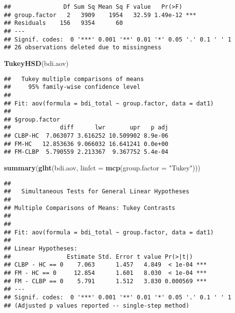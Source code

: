 \documentclass[]{article}
\newenvironment{Shaded}{\begin{snugshade}}{\end{snugshade}}
\newcommand{\KeywordTok}[1]{\textcolor[rgb]{0.13,0.29,0.53}{\textbf{#1}}}
\newcommand{\DataTypeTok}[1]{\textcolor[rgb]{0.13,0.29,0.53}{#1}}
\newcommand{\StringTok}[1]{\textcolor[rgb]{0.31,0.60,0.02}{#1}}
\newcommand{\OperatorTok}[1]{\textcolor[rgb]{0.81,0.36,0.00}{\textbf{#1}}}
\newcommand{\NormalTok}[1]{#1}
\begin{document}
\begin{verbatim}
##               Df Sum Sq Mean Sq F value   Pr(>F)    
## group.factor   2   3909    1954   32.59 1.49e-12 ***
## Residuals    156   9354      60                     
## ---
## Signif. codes:  0 '***' 0.001 '**' 0.01 '*' 0.05 '.' 0.1 ' ' 1
## 26 observations deleted due to missingness
\end{verbatim}

\begin{Shaded}
\begin{Highlighting}[]
\KeywordTok{TukeyHSD}\NormalTok{(bdi.aov)}
\end{Highlighting}
\end{Shaded}

\begin{verbatim}
##   Tukey multiple comparisons of means
##     95% family-wise confidence level
## 
## Fit: aov(formula = bdi_total ~ group.factor, data = dat1)
## 
## $group.factor
##              diff      lwr       upr   p adj
## CLBP-HC  7.063077 3.616252 10.509902 8.9e-06
## FM-HC   12.853636 9.066032 16.641241 0.0e+00
## FM-CLBP  5.790559 2.213367  9.367752 5.4e-04
\end{verbatim}

\begin{Shaded}
\begin{Highlighting}[]
\KeywordTok{summary}\NormalTok{(}\KeywordTok{glht}\NormalTok{(bdi.aov, }\DataTypeTok{linfct =} \KeywordTok{mcp}\NormalTok{(}\DataTypeTok{group.factor =} \StringTok{"Tukey"}\NormalTok{)))}
\end{Highlighting}
\end{Shaded}

\begin{verbatim}
## 
##   Simultaneous Tests for General Linear Hypotheses
## 
## Multiple Comparisons of Means: Tukey Contrasts
## 
## 
## Fit: aov(formula = bdi_total ~ group.factor, data = dat1)
## 
## Linear Hypotheses:
##                Estimate Std. Error t value Pr(>|t|)    
## CLBP - HC == 0    7.063      1.457   4.849  < 1e-04 ***
## FM - HC == 0     12.854      1.601   8.030  < 1e-04 ***
## FM - CLBP == 0    5.791      1.512   3.830 0.000569 ***
## ---
## Signif. codes:  0 '***' 0.001 '**' 0.01 '*' 0.05 '.' 0.1 ' ' 1
## (Adjusted p values reported -- single-step method)
\end{verbatim}

\begin{Shaded}
\end{Shaded}
\end{document}

